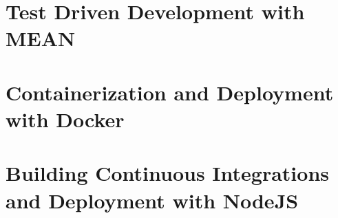 \newpage

\section{Test Driven Development with MEAN}
\label{section:Test Driven Development with MEAN}


\newpage

\section{Containerization and Deployment with Docker}
\label{section:Containerization and Deployment with Docker}


\newpage

\section{Building Continuous Integrations and Deployment with NodeJS}
\label{section:Building Continuous Integrations and Deployment with NodeJS}


\newpage








%
%
%
%
%
%
